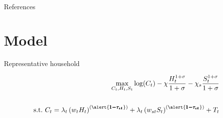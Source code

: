 \documentclass[11pt,aspectratio=169]{beamer}
\begin{document}
		\appendix
		
		\begin{frame}[shrink]{References}
			
			
			
		\end{frame}
		
		\section*{Model}
		
	\begin{frame}{Representative household}
		\hypertarget{modhh}{}
		\vspace{2mm}
		\begin{minipage}[t!]{1\textwidth}
			\begin{align*}
				\max_{C_t, H_{t}, S_{t}} \log(C_t)-\chi\frac{H_{t}^{1+\sigma}}{1+\sigma}-\chi_s\frac{S_{t}^{1+\sigma}}{1+\sigma}
				\\
				\vspace{4mm}
				\\
				\text{s.t.}\ C_t=\lambda_t\left(w_{t}H_{t}\right)^{(\alert{\pmb{1-\tau_{\iota t}}})}+\lambda_t \left(w_{st}S_t\right)^{(\alert{\pmb{1-\tau_{\iota t}}})}+T_t%
			\end{align*}
		\end{minipage}
		

\end{frame}
\end{document}
